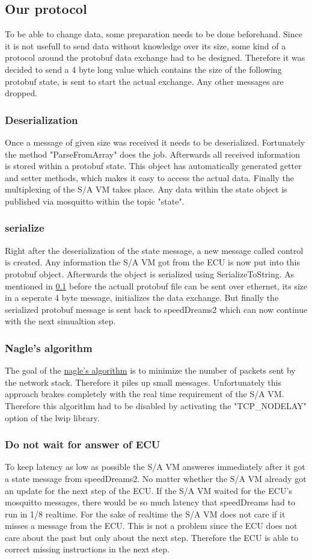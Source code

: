 \documentclass[paper=a4, fontsize=11pt]{scrartcl}
\begin{document}
  \subsection{Our protocol} \label{ourprotocol}
To be able to change data, some preparation needs to be done beforehand. Since it is not usefull to send data without knowledge over its size, some kind of a protocol around the protobuf data exchange had to be designed. Therefore it was decided to send a 4 byte long value which contains the size of the following protobuf state, is sent to start the actual exchange. Any other messages are dropped.
  \subsubsection{Deserialization}
Once a message of given size was received it needs to be deserialized. Fortunately the method "ParseFromArray" does the job. Afterwards all received information is stored within a protobuf state. This object has automatically generated getter and setter methods, which makes it easy to access the actual data. Finally the multiplexing of the S/A VM takes place. Any data within the state object is published via mosquitto within the topic "state".
  \subsubsection{serialize}
Right after the deserialization of the state message, a new message called control is created. Any information the S/A VM got from the ECU is now put into this protobuf object. Afterwards the object is serialized using SerializeToString. As mentioned in \ref{ourprotocol} before the actuall protobuf file can be sent over ethernet, its size in a seperate 4 byte message, initializes the data exchange. But finally the serialized protobuf message is sent back to speedDreams2 which can now continue with the next simualtion step.
  \subsubsection{Nagle's algorithm}
The goal of the \href{https://www.lifewire.com/nagle-algorithm-for-tcp-network-communication-817932}{nagle's algorithm} is to minimize the number of packets sent by the network stack. Therefore it piles up small messages. Unfortunately this approach brakes completely with the real time requirement of the S/A VM. Therefore this algorithm had to be disabled by activating the "TCP\_NODELAY" option of the lwip library.
  \subsubsection{Do not wait for answer of ECU}
To keep latency as low as possible the S/A VM answeres immediately after it got a state message from speedDreams2. No matter whether the S/A VM already got an update for the next step of the ECU. If the S/A VM waited for the ECU's mosquitto messages, there would be so much latency that speedDreams had to run in 1/8 realtime. For the sake of realtime the S/A VM does not care if it misses a message from the ECU. This is not a problem since the ECU does not care about the past but only about the next step. Therefore the ECU is able to correct missing instructions in the next step.
\end{document}
